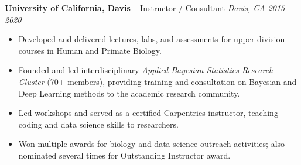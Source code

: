 \documentclass[10pt, letterpaper]{article}
\newenvironment{highlights}{
    \begin{itemize}[
        topsep=0.05 cm, %
        parsep=0.05 cm, %
        partopsep=0pt,
        itemsep=0pt,
        leftmargin=0.4 cm + 10pt, %
        label=\textbf{--} %
    ]
}{
    \end{itemize}
}
\begin{document}
        \vspace{0.15 cm} %

        \textbf{University of California, Davis} -- Instructor / Consultant \hfill \textit{\textcolor{primaryColor}{Davis, CA \textbar{} 2015 -- 2020}} %
        \begin{highlights}
             \item Developed and delivered lectures, labs, and assessments for upper-division courses in Human and Primate Biology.
             \item Founded and led interdisciplinary \textit{Applied Bayesian Statistics Research Cluster} (70+ members), providing training and consultation on Bayesian and Deep Learning methods to the academic research community.
             \item Led workshops and served as a certified Carpentries instructor, teaching coding and data science skills to researchers.
             \item Won multiple awards for biology and data science outreach activities; also nominated several times for Outstanding Instructor award.
        \end{highlights}

\end{document}
